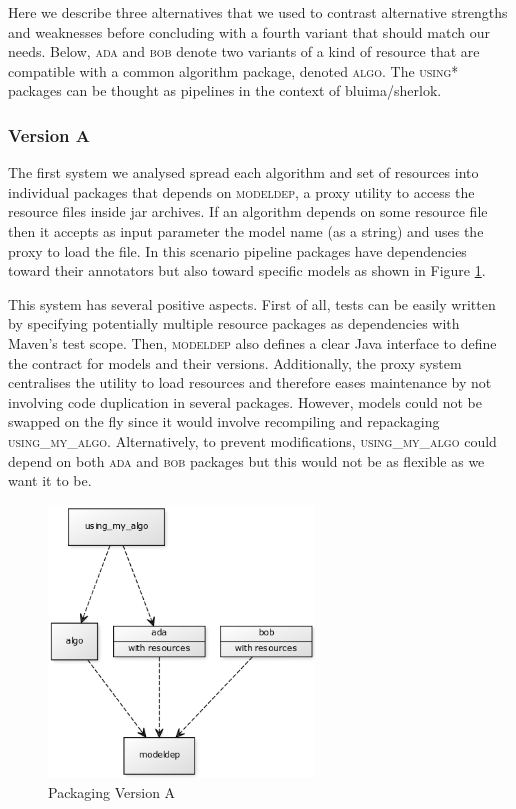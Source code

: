 \documentclass{article}
\newcommand{\ID}[1]{\mbox{\textsc{#1}}}
\begin{document}
Here we describe three alternatives that we used to contrast alternative strengths and weaknesses before concluding with a fourth variant that should match our needs. Below, \ID{ada} and \ID{bob} denote two variants of a kind of resource that are compatible with a common algorithm package, denoted \ID{algo}. The \ID{using*} packages can be thought as pipelines in the context of bluima/sherlok.

\subsubsection{Version A}

The first system we analysed spread each algorithm and set of resources into individual packages that depends on \ID{modeldep}, a proxy utility to access the resource files inside jar archives. If an algorithm depends on some resource file then it accepts as input parameter the model name (as a string) and uses the proxy to load the file. In this scenario pipeline packages have dependencies toward their annotators but also toward specific models as shown in Figure \ref{fig:pkgsysA}.

This system has several positive aspects. First of all, tests can be easily written by specifying potentially multiple resource packages as dependencies with Maven's test scope. Then, \ID{modeldep} also defines a clear Java interface to define the contract for models and their versions. Additionally, the proxy system centralises the utility to load resources and therefore eases maintenance by not involving code duplication in several packages. However, models could not be swapped on the fly since it would involve recompiling and repackaging \ID{using\_my\_algo}.  Alternatively, to prevent modifications, \ID{using\_my\_algo} could depend on both \ID{ada} and \ID{bob} packages but this would not be as flexible as we want it to be.

\begin{figure}
\centering
\includegraphics[width=200pt]{res/packaging_version_A.png}
\caption{Packaging Version A}
\label{fig:pkgsysA}
\end{figure}
\end{document}
